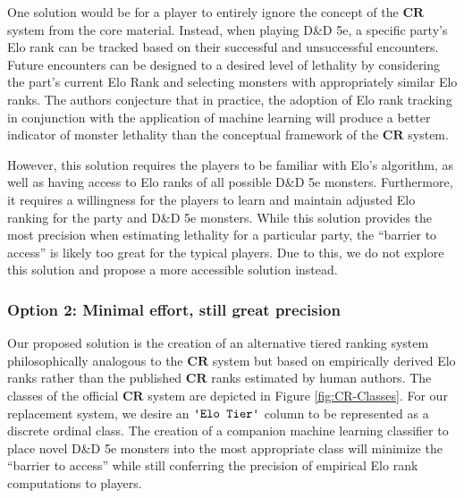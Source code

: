 \documentclass{article}
\newcommand{\CR}{\ensuremath{\mathbf{CR}}\xspace}
\newcommand{\DnD}{D\&D 5e\xspace}
\newcommand{\Column}[1]{\ensuremath{\texttt{\textquotesingle{}#1\textquotesingle{}}}\xspace}
\begin{document}
One solution would be for a player to entirely ignore the concept of the \CR system from the core material. Instead, when playing \DnD, a specific party's Elo rank can be tracked based on their successful and unsuccessful encounters.
Future encounters can be designed to a desired level of lethality by considering the part's current Elo Rank and selecting monsters with appropriately similar Elo ranks.
The authors conjecture that in practice, the adoption of Elo rank tracking in conjunction with the application of machine learning will produce a better indicator of monster lethality than the conceptual framework of the \CR system.

However, this solution requires the players to be familiar with Elo's algorithm, as well as having access to Elo ranks of all possible \DnD monsters.
Furthermore, it requires a willingness for the players to learn and maintain adjusted Elo ranking for the party and \DnD monsters.
While this solution provides the most precision when estimating lethality for a particular party, the ``barrier to access'' is likely too great for the typical players. Due to this, we do not explore this solution and propose a more accessible solution instead.


\subsubsection{Option 2: Minimal effort, still great precision}

Our proposed solution is the creation of an alternative tiered ranking system philosophically analogous to the \CR system but based on empirically derived Elo ranks rather than the published \CR ranks estimated by human authors.
The classes of the official \CR system are depicted in Figure \ref{fig:CR-Classes}.
For our replacement system, we desire an \Column{Elo Tier} column to be represented as a discrete ordinal class.
The creation of a companion machine learning classifier to place novel \DnD monsters into the most appropriate class will minimize the ``barrier to access'' while still conferring the precision of empirical Elo rank computations to players.
\end{document}
